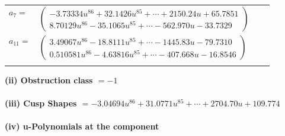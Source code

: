 \documentclass[1p]{elsarticle_modified}
\theoremstyle{definition}
\begin{document}
\begin{tabular}{m{7pt} m{180pt} m{7pt} m{180pt} }
\flushright $a_{7}=$&$\begin{pmatrix}-3.73334 u^{86}+32.1426 u^{85}+\cdots+2150.24 u+65.7851\\8.70129 u^{86}-35.1065 u^{85}+\cdots-562.970 u-33.7329\end{pmatrix}$ \\
\flushright $a_{11}=$&$\begin{pmatrix}3.49067 u^{86}-18.8111 u^{85}+\cdots-1445.83 u-79.7310\\0.510581 u^{86}-4.63816 u^{85}+\cdots-407.668 u-16.8546\end{pmatrix}$\\&\end{tabular}
\flushleft \textbf{(ii) Obstruction class $= -1$}\\~\\
\flushleft \textbf{(iii) Cusp Shapes $= -3.04694 u^{86}+31.0771 u^{85}+\cdots+2704.70 u+109.774$}\\~\\
\newpage\renewcommand{\arraystretch}{1}
\flushleft \textbf{(iv) u-Polynomials at the component}\newline \\
\end{document}
